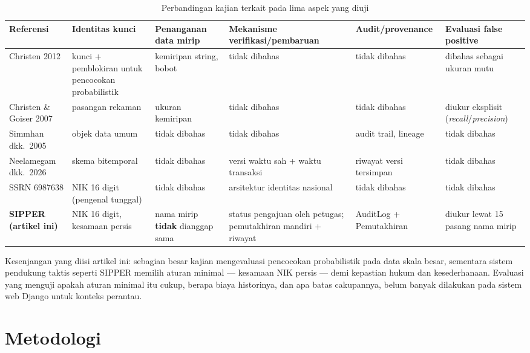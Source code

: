 \documentclass[11pt,a4paper]{article}
\begin{document}
\begin{table}[htbp]
\centering
\scriptsize
\renewcommand{\arraystretch}{1.25}
\begin{tabular}{@{}p{2.7cm}p{2.6cm}p{2.6cm}p{2.9cm}p{2.4cm}p{2.4cm}@{}}
\toprule
\textbf{Referensi} & \textbf{Identitas kunci} & \textbf{Penanganan data mirip} & \textbf{Mekanisme verifikasi/pembaruan} & \textbf{Audit/provenance} & \textbf{Evaluasi false positive} \\
\midrule
Christen 2012 \cite{christen2012} & kunci + pemblokiran untuk pencocokan probabilistik & kemiripan string, bobot & tidak dibahas & tidak dibahas & dibahas sebagai ukuran mutu \\
Christen \& Goiser 2007 \cite{christen2007} & pasangan rekaman & ukuran kemiripan & tidak dibahas & tidak dibahas & diukur eksplisit (\emph{recall}/\emph{precision}) \\
Simmhan dkk.~2005 \cite{simmhan2005} & objek data umum & tidak dibahas & tidak dibahas & audit trail, lineage & tidak dibahas \\
Neelamegam dkk.~2026 \cite{neelamegam2026} & skema bitemporal & tidak dibahas & versi waktu sah + waktu transaksi & riwayat versi tersimpan & tidak dibahas \\
SSRN 6987638 \cite{ssrn-nik} & NIK 16 digit (pengenal tunggal) & tidak dibahas & arsitektur identitas nasional & tidak dibahas & tidak dibahas \\
\textbf{SIPPER (artikel ini)} & NIK 16 digit, kesamaan persis & nama mirip \textbf{tidak} dianggap sama & status pengajuan oleh petugas; pemutakhiran mandiri + riwayat & AuditLog + Pemutakhiran & diukur lewat 15 pasang nama mirip \\
\bottomrule
\end{tabular}
\caption{Perbandingan kajian terkait pada lima aspek yang diuji}
\label{tab:rwy}
\end{table}

Kesenjangan yang diisi artikel ini: sebagian besar kajian mengevaluasi pencocokan probabilistik pada data skala besar, sementara sistem pendukung taktis seperti SIPPER memilih aturan minimal --- kesamaan NIK persis --- demi kepastian hukum dan kesederhanaan. Evaluasi yang menguji apakah aturan minimal itu cukup, berapa biaya historinya, dan apa batas cakupannya, belum banyak dilakukan pada sistem web Django untuk konteks perantau.

\section{Metodologi}
\end{document}
